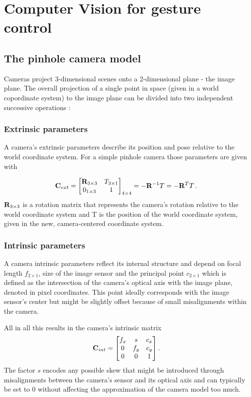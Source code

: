 			
\section { Computer Vision for gesture control}
	\subsection { The pinhole camera model }
		Cameras project 3-dimensional scenes onto a 2-dimensional plane - the image plane.
		The overall projection of a single point in space (given in a world copordinate system) to the image plane can be divided into two independent successive operations \cite[S.~50]{Szeliski2010}:
		
		\subsubsection{Extrinsic parameters}
			A camera's extrinsic parameters describe its position and pose relative to the world coordinate system. For a simple pinhole camera those parameters are given with 
			
			\begin{equation}
			\mathbf{C}_{ext} = \begin{bmatrix}
						\mathbf{R}_{3\times 3} & T_{3\times 1}\\
						0_{1\times 3} & 1
						\end{bmatrix}_{4\times 4} = -\mathbf{R}^{-1}T = -\mathbf{R}^TT \, . 
			\end{equation}
			$\mathbf{R}_{3\times 3}$ is a rotation matrix that represents the camera's rotation relative to the world coordinate system and T is the position of the world coordinate system, given in the new, camera-centered coordinate system. 
	
		\subsubsection{Intrinsic parameters}
			A camera intrinsic parameters reflect its internal structure and depend on focal length $f_{2\times 1}$, size of the image sensor and the principal point $c_{2\times1}$ which is defined as the intersection of the camera's optical axis with the image plane, denoted in pixel coordinates. This point ideally corresponds with the image sensor's center but might be slightly offset because of small misalignments within the camera.
			
			All in all this results in the camera's intrinsic matrix
			\begin{equation}
			\mathbf{C}_{int} = \begin{bmatrix}
				f_x & s & c_x  \\
				0 & f_y & c_y \\
				0 & 0 & 1 
				\end{bmatrix}.
			\end{equation}
			The factor $s$ encodes any possible skew that might be introduced through misalignments between the camera's sensor and its optical axis and can typically be set to $0$ without affecting the approximation of the camera model too much.
		
